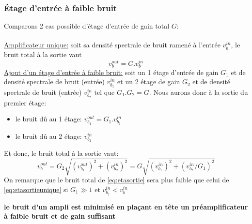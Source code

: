 \subsubsection{Étage d'entrée à faible bruit} \label{subsubsec:entreenobruit}
Comparons 2 cas possible d'étage d'entrée de gain total \(G\):\\\\
\underline{Amplificateur unique:}  soit sa densité spectrale de bruit ramené à l'entrée \(v_b^{in}\), le bruit total à la sortie vaut
\begin{equation}\label{eq:etasortieunique}
v_b^{out}=G . v_b^{in}
\end{equation}
\underline{Ajout d'un étage d'entrée à faible bruit:} soit un 1 étage d'entrée de gain \(G_1\) et de densité spectrale de bruit (entrée) \(v_{b_1}^{in}\) et un 2 étage de gain \(G_2\) et de densité spectrale de bruit (entrée) \(v_{b_2}^{in}\) tel que \(G_1 . G_2 = G\). Nous aurons donc à la sortie du premier étage:
\begin{itemize}
	\item le bruit dû au 1 étage: \(v_{b_1}^{out}=G_1 . v_{b_1}^{in}\)
	\item le bruit dû au 2 étage: \(v_{b_2}^{in}\)
\end{itemize}
Et donc, le bruit total à la sortie vaut:
\begin{equation}\label{eq:etasortie}
v_b^{out} = G_2\sqrt{\left(v_{b_1}^{out}\right)^2 + \left(v_{b_2}^{in}\right)^2} = G\sqrt{\left(v_{b_1}^{in}\right)^2 + \left(v_{b_2}^{in}/G_1\right)^2}
\end{equation}
On remarque que le bruit total de \eqref{eq:etasortie} sera plus faible que celui de \eqref{eq:etasortieunique} si \(G_1\gg 1\text{ et } v_{b_1}^{in}<v_b^{in}\)
\begin{center}
	\textbf{le bruit d'un ampli est minimisé en plaçant en tête un préamplificateur à faible bruit et de gain suffisant}
\end{center}

